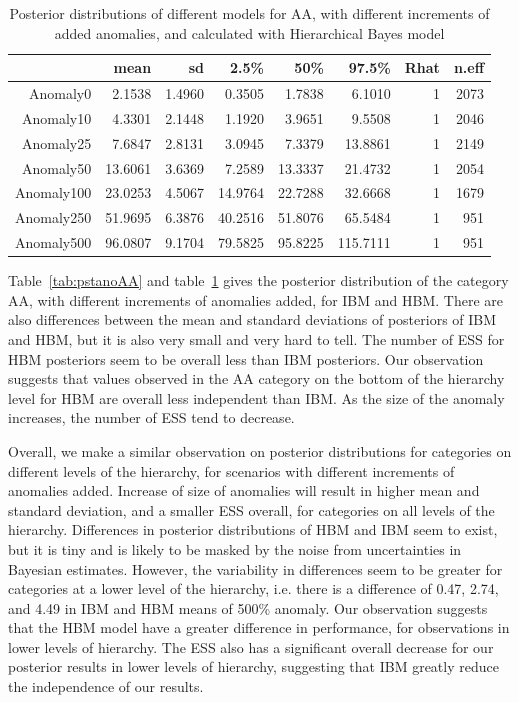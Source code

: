 \begin{table}[ht]
	\centering
	\begin{tabular}{rrrrrrrr}
		\hline
		& mean & sd & 2.5\% & 50\% & 97.5\% & Rhat & n.eff \\ 
		\hline
		Anomaly0 & 2.1538 & 1.4960 & 0.3505 & 1.7838 & 6.1010 & 1 & 2073 \\ 
		Anomaly10 & 4.3301 & 2.1448 & 1.1920 & 3.9651 & 9.5508 & 1 & 2046 \\ 
		Anomaly25 & 7.6847 & 2.8131 & 3.0945 & 7.3379 & 13.8861 & 1 & 2149 \\ 
		Anomaly50 & 13.6061 & 3.6369 & 7.2589 & 13.3337 & 21.4732 & 1 & 2054 \\ 
		Anomaly100 & 23.0253 & 4.5067 & 14.9764 & 22.7288 & 32.6668 & 1 & 1679 \\ 
		Anomaly250 & 51.9695 & 6.3876 & 40.2516 & 51.8076 & 65.5484 & 1 & 951 \\ 
		Anomaly500 & 96.0807 & 9.1704 & 79.5825 & 95.8225 & 115.7111 & 1& 951 \\ 
		\hline
	\end{tabular}
	\caption{Posterior distributions of different models for AA, with different increments of added anomalies, and calculated with Hierarchical Bayes model} 
	\label{tab:pstanoAA2}
\end{table}

Table~\ref{tab:pstanoAA} and table~\ref{tab:pstanoAA2} gives the posterior distribution of the category AA, with different increments of anomalies added, for IBM and HBM. There are also differences between the mean and standard deviations of posteriors of IBM and HBM, but it is also very small and very hard to tell. The number of ESS for HBM posteriors seem to be overall less than IBM posteriors. Our observation suggests that values observed in the AA category on the bottom of the hierarchy level for HBM are overall less independent than IBM. As the size of the anomaly increases, the number of ESS tend to decrease. 

\newpage

Overall, we make a similar observation on posterior distributions for categories on different levels of the hierarchy, for scenarios with different increments of anomalies added. Increase of size of anomalies will result in higher mean and standard deviation, and a smaller ESS overall, for categories on all levels of the hierarchy. Differences in posterior distributions of HBM and IBM seem to exist, but it is tiny and is likely to be masked by the noise from uncertainties in Bayesian estimates. However, the variability in differences seem to be greater for categories at a lower level of the hierarchy, i.e. there is a difference of 0.47, 2.74, and 4.49 in IBM and HBM means of 500\% anomaly. Our observation suggests that the HBM model have a greater difference in performance, for observations in lower levels of hierarchy. The ESS also has a significant overall decrease for our posterior results in lower levels of hierarchy, suggesting that IBM greatly reduce the independence of our results. 
\newpara


